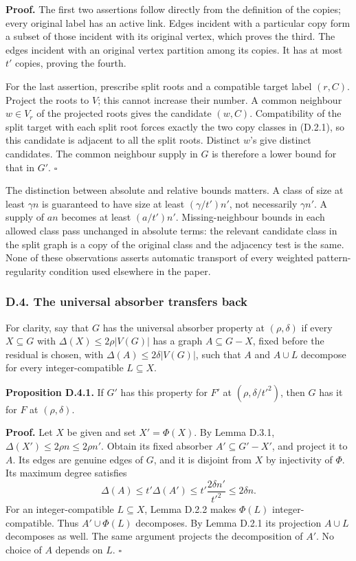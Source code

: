 \documentclass[english,11pt,a4paper]{article}
\begin{document}
\textbf{Proof.} The first two assertions follow directly from the definition of the copies; every original label has an active link. Edges incident with a particular copy form a subset of those incident with its original vertex, which proves the third. The edges incident with an original vertex partition among its copies. It has at most \(t'\) copies, proving the fourth.

For the last assertion, prescribe split roots and a compatible target label \((r,C)\). Project the roots to \(V\); this cannot increase their number. A common neighbour \(w\in V_r\) of the projected roots gives the candidate \((w,C)\). Compatibility of the split target with each split root forces exactly the two copy classes in (D.2.1), so this candidate is adjacent to all the split roots. Distinct \(w\)'s give distinct candidates. The common neighbour supply in \(G\) is therefore a lower bound for that in \(G'\). \(\square\)

The distinction between absolute and relative bounds matters. A class of size at least \(\gamma n\) is guaranteed to have size at least \((\gamma/t')n'\), not necessarily \(\gamma n'\). A supply of \(an\) becomes at least \((a/t')n'\). Missing-neighbour bounds in each allowed class pass unchanged in absolute terms: the relevant candidate class in the split graph is a copy of the original class and the adjacency test is the same. None of these observations asserts automatic transport of every weighted pattern-regularity condition used elsewhere in the paper.

\subsubsection{D.4. The universal absorber transfers back}\label{d.4.-the-universal-absorber-transfers-back}

For clarity, say that \(G\) has the universal absorber property at \((\rho,\delta)\) if every \(X\subseteq G\) with \(\Delta(X)\le2\rho|V(G)|\) has a graph \(A\subseteq G-X\), fixed before the residual is chosen, with \(\Delta(A)\le2\delta|V(G)|\), such that \(A\) and \(A\cup L\) decompose for every integer-compatible \(L\subseteq X\).

\textbf{Proposition D.4.1.} If \(G'\) has this property for \(F'\) at \((\rho,\delta/t'^2)\), then \(G\) has it for \(F\) at \((\rho,\delta)\).

\textbf{Proof.} Let \(X\) be given and set \(X'=\Phi(X)\). By Lemma D.3.1, \(\Delta(X')\le2\rho n\le2\rho n'\). Obtain its fixed absorber \(A'\subseteq G'-X'\), and project it to \(A\). Its edges are genuine edges of \(G\), and it is disjoint from \(X\) by injectivity of \(\Phi\). Its maximum degree satisfies \[\Delta(A)\le t'\Delta(A')
\le t'\frac{2\delta n'}{t'^2}
\le2\delta n.
\tag{D.4.1}\] For an integer-compatible \(L\subseteq X\), Lemma D.2.2 makes \(\Phi(L)\) integer-compatible. Thus \(A'\cup\Phi(L)\) decomposes. By Lemma D.2.1 its projection \(A\cup L\) decomposes as well. The same argument projects the decomposition of \(A'\). No choice of \(A\) depends on \(L\). \(\square\)
\end{document}
